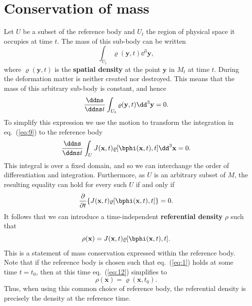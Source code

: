 \section*{Conservation of mass}
Let $U$ be a subset of the reference body and $U_{t}$ the region of physical space it occupies at time $t$. The mass of this 
sub-body can be written
\begin{equation}
\int_{U_{t}}\varrho(\mathbf{y},t)\dd^{3}\mathbf{y},
\label{eq:8}
\end{equation}
where $\varrho(\mathbf{y},t)$ is the \textbf{spatial density} at the point $\mathbf{y}$ in $M_{t}$ at time $t$. During the deformation matter is 
neither created nor destroyed. This means that the mass of this arbitrary sub-body is constant, and hence 
\begin{equation}
\frac{\ddns}{\ddns t}\int_{U_{t}}\varrho(\mathbf{y},t)\dd^{3}\mathbf{y}=0.
\label{eq:9}
\end{equation}
To simplify this expression we use the motion to transform the integration in eq.~(\ref{eq:9}) to the reference body
\begin{equation}
\frac{\ddns}{\ddns t}\int_{U}J(\mathbf{x},t)\varrho[\bphi(\mathbf{x},t),t]\dd^{3}\mathbf{x}=0.
\label{eq:10}
\end{equation}
This integral is over a fixed domain, and so we can interchange the order of differentiation and integration. Furthermore, as 
$U$ is an arbitrary subset of $M$, the resulting equality can hold for every such $U$ if and only if
\begin{equation}
\frac{\partial}{\partial t}\{J(\mathbf{x},t)\varrho[\bphi(\mathbf{x},t),t]\}=0.
\label{eq:11}
\end{equation}
It follows that we can introduce a time-independent \textbf{referential density} $\rho$ such that
\begin{equation}
\rho(\mathbf{x})=J(\mathbf{x},t)\varrho[\bphi(\mathbf{x},t),t].
\label{eq:12}
\end{equation}
This is a statement of mass conservation expressed within the reference body. Note that if the reference body is chosen such 
that eq.~(\ref{eq:1}) holds at some time $t=t_{0}$, then at this time eq.~(\ref{eq:12}) simplifies to
\begin{equation}
\rho(\mathbf{x})=\varrho(\mathbf{x},t_{0}).
\label{eq:13}
\end{equation}
Thus, when using this common choice of reference body, the referential density is precisely the density at the reference time.

